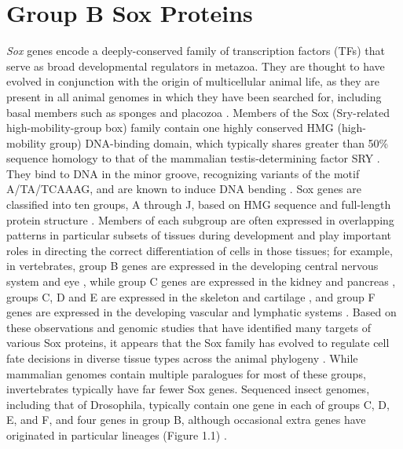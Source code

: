 \section{Group B Sox Proteins}
\emph{Sox} genes encode a deeply-conserved family of transcription factors (TFs) that serve as broad developmental regulators in metazoa. They are thought to have evolved in conjunction with the origin of multicellular animal life, as they are present in all animal genomes in which they have been searched for, including basal members such as sponges and placozoa \citep{jager_expansion_2006,jager_insights_2008,larroux_developmental_2006,phochanukul_no_2010,srivastava_trichoplax_2008}. Members of the Sox (Sry-related high-mobility-group box) family contain one highly conserved HMG (high-mobility group) DNA-binding domain, which typically shares greater than 50\% sequence homology to that of the mammalian testis-determining factor SRY \citep{bowles_phylogeny_2000-1,guth_having_2008,phochanukul_no_2010,sinclair_gene_1990}. They bind to DNA in the minor groove, recognizing variants of the motif A/TA/TCAAAG, and are known to induce DNA bending \citep{bowles_phylogeny_2000-1,ferrari_sry_1992,giese_hmg_1992}. Sox genes are classified into ten groups, A through J, based on HMG sequence and full-length protein structure \citep{schepers_twenty_2002}. Members of each subgroup are often expressed in overlapping patterns in particular subsets of tissues during development and play important roles in directing the correct differentiation of cells in those tissues; for example, in vertebrates, group B genes are expressed in the developing central nervous system and eye \citep{bergsland_sequentially_2011,kamachi_involvement_1998,uwanogho_embryonic_1995,wood_comparative_1999}, while group C genes are expressed in the kidney and pancreas \citep{huang_transcription_2013,sock_gene_2004,wilson_hmg_2005}, groups C, D and E are expressed in the skeleton and cartilage \citep{akiyama_transcription_2002,smits_transcription_????}, and group F genes are expressed in the developing vascular and lymphatic systems \citep{downes_sox18_????,matsui_redundant_2006}. Based on these observations and genomic studies that have identified many targets of various Sox proteins, it appears that the Sox family has evolved to regulate cell fate decisions in diverse tissue types across the animal phylogeny \citep{lefebvre_control_2007,whyte_master_2013}. While mammalian genomes contain multiple paralogues for most of these groups, invertebrates typically have far fewer Sox genes. Sequenced insect genomes, including that of Drosophila, typically contain one gene in each of groups C, D, E, and F, and four genes in group B, although occasional extra genes have originated in particular lineages (Figure 1.1) \citep{bowles_phylogeny_2000-1,phochanukul_no_2010}.\\

